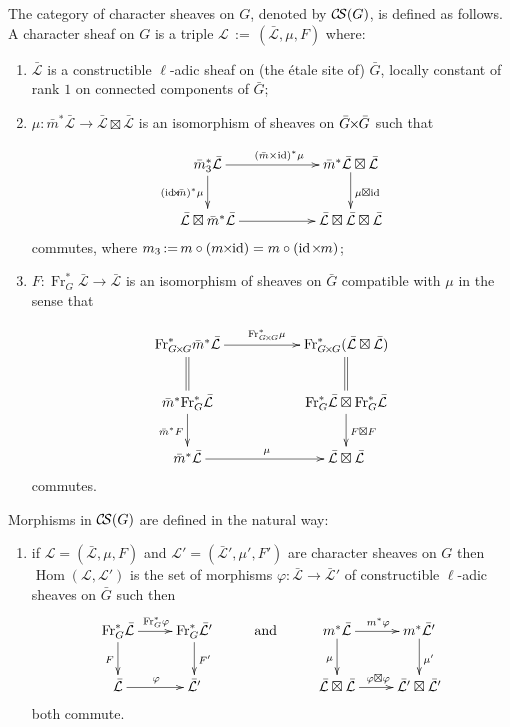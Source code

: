 \documentclass[11pt]{amsart}
\makeatletter
\theoremstyle{plain}
\theoremstyle{definition}
\theoremstyle{remark}
\newcommand{\Frob}{{\operatorname{Fr}}}
\DeclareMathOperator{\Hom}{Hom}
\DeclareMathOperator{\id}{id}
\newcommand{\cdef}[1]{{{\color{cyan}#1}\index{#1}}}
\newcommand{\ceq}{{\, :=\, }}
\newcommand{\cs}[1]{{\mathcal{#1}}}
\newcommand{\gcs}[1]{{\mathcal{\bar #1}}}
\newcommand{\CS}{{\mathcal{C\hskip-1.8pt S}}}
\newcommand{\labitem}[2]{%
\def\@itemlabel{\textbf{#1}}
\item
\def\@currentlabel{#1}\label{#2}}
\newcommand{\tighttimes}{\hskip-1pt\times\hskip-1pt}
\newcommand{\tightertimes}{\hskip-3pt\times\hskip-3pt}
\makeatother
\begin{document}
The category of character sheaves on $G$, denoted by \cdef{$\CS(G)$},
is defined as follows.  A \cdef{character sheaf} on $G$ is a triple
$\cs{L}\ceq (\gcs{L},\mu,F)$ where:
\begin{enumerate}
\labitem{(CS.0)}{CS.0} $\gcs{L}$ is a constructible $\ell$-adic
  sheaf on (the \'etale site of) ${\bar G}$, locally constant of rank
  $1$ on connected components of ${\bar G}$;

\labitem{(CS.1)}{CS.1} $\mu: {\bar m}^* \gcs{L} \to \gcs{L}\boxtimes \gcs{L}$
  is an isomorphism of sheaves on ${\bar G}\tightertimes {\bar G}$ such that

  \[
  \xymatrix{
    {\bar m}_3^*\gcs{L} \ar[rr]^{({\bar m}\times \id)^*\mu} \ar[d]_{(\id\tightertimes {\bar m})^*\mu}
    &&  {\bar m}^*\gcs{L}\boxtimes \gcs{L} \ar[d]^{\mu \boxtimes \id} \\
    \gcs{L} \boxtimes {\bar m}^* \gcs{L} \ar[rr]
    &&  \gcs{L} \boxtimes\gcs{L} \boxtimes \gcs{L}\\
  }
  \]
  commutes, where $m_3 \ceq m\circ (m\tightertimes\id) = m\circ (\id\tighttimes m)$;

\labitem{(CS.2)}{CS.2} $F : \Frob_{G}^* \gcs{L} \to \gcs{L}$ is an
  isomorphism of sheaves on ${\bar G}$ compatible with $\mu$ in the sense that

  \[
  \xymatrix{
    \Frob_{G\tighttimes G}^* {\bar m}^* \gcs{L} \ar[rr]^{\Frob_{G\tighttimes G}^*\mu}
    && \Frob_{G\tighttimes G}^*(\gcs{L}\boxtimes \gcs{L})\\
    \ar@{=}[u] {\bar m}^*  \Frob_{G}^* \gcs{L} \ar[d]_{{\bar m}^* F}
    && \ar[d]^{F\boxtimes F} \ar@{=}[u] \Frob_{G}^*\gcs{L}\boxtimes \Frob_{G}^*\gcs{L}\\
    {\bar m}^*\gcs{L} \ar[rr]^{\mu}
    && \gcs{L} \boxtimes\gcs{L}\\
  }
  \]
  commutes.
\end{enumerate}
Morphisms in $\CS(G)$ are defined in the natural way:
\begin{enumerate}
\labitem{(CS.3)}{CS.3} if $\cs{L} = (\gcs{L},\mu,F)$ and
  $\cs{L'} = (\gcs{L'},\mu',F')$ are character sheaves on $G$ then
  $\Hom(\cs{L},\cs{L'})$ is the set of morphisms $\varphi : \gcs{L} \to \gcs{L'}$
  of constructible $\ell$-adic sheaves on ${\bar G}$ such then
  \[
  \xymatrix{
  \ar[d]_{F} \Frob_G^* \gcs{L} \ar[r]^{\Frob_G^* \varphi} & \ar[d]^{F'} \Frob_G^* \gcs{L'}
  & \text{and}& \ar[d]_{\mu} m^* \gcs{L} \ar[r]^{m^* \varphi} & \ar[d]^{\mu'} m^* \gcs{L'} \\
  \gcs{L} \ar[r]^{\varphi} & \gcs{L'}
  && \gcs{L}\boxtimes\gcs{L} \ar[r]^{\varphi\boxtimes \varphi} & \gcs{L'} \boxtimes \gcs{L'}\\
  }
  \]
  both commute.
\end{enumerate}
\end{document}
